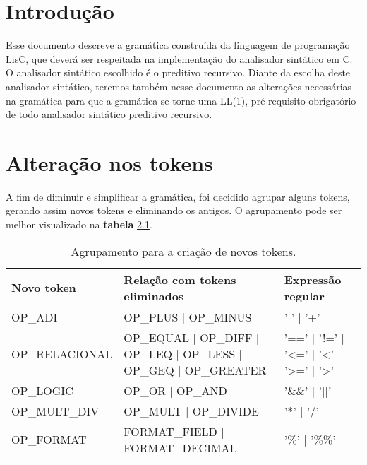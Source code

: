 \documentclass[
  12pt,				%
  oneside,			%
  a4paper,			%
  english,			%
  french,				%
  spanish,			%
  brazil,				%
]{abntex2}
\begin{document}
\frenchspacing 



\imprimirfolhaderosto*


\tableofcontents*

\textual
\chapter{Introdução}
\label{cha:intro}
Esse documento descreve a gramática construída da linguagem de
programação LisC, que deverá ser respeitada na implementação do
analisador sintático em C. O analisador sintático escolhido é o
preditivo recursivo. Diante da escolha deste analisador sintático,
teremos também nesse documento as alterações necessárias na gramática
para que a gramática se torne uma LL(1), pré-requisito obrigatório de
todo analisador sintático preditivo recursivo.

\chapter{Alteração nos tokens}
\label{cha:alteracao-nos-tokens}

A fim de diminuir e simplificar a gramática, foi decidido agrupar
alguns tokens, gerando assim novos tokens e eliminando os antigos.
O agrupamento pode ser melhor visualizado na \textbf{tabela}
\ref{tab:agrupamento}.

\begin{table}[H]
  \centering
\begin{tabularx}{16cm}{|X|X|X|}
\hline
Novo token & Relação com tokens eliminados & Expressão regular    \\ \hline
OP\_ADI & OP\_PLUS | OP\_MINUS & '-' | '+' \\ \hline
OP\_RELACIONAL & OP\_EQUAL | OP\_DIFF | OP\_LEQ | OP\_LESS | OP\_GEQ |
OP\_GREATER & '==' | '!=' | '<=' | '<' | '>=' | '>' \\ \hline
OP\_LOGIC & OP\_OR | OP\_AND & '\&\&' | '||' \\ \hline
OP\_MULT\_DIV & OP\_MULT | OP\_DIVIDE & '*' | '/' \\ \hline
OP\_FORMAT & FORMAT\_FIELD | FORMAT\_DECIMAL & '\%' | '\%\%' \\ \hline
\end{tabularx}
\caption{Agrupamento para a criação de novos tokens.}
\label{tab:agrupamento}
\end{table}
\end{document}
